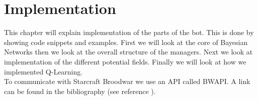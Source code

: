 \chapter{Implementation}
This chapter will explain implementation of the parts of the bot. This is done by showing code snippets and examples. First we will look at the core of Bayesian Networks then we look at the overall structure of the managers. Next we look at implementation of the different potential fields. Finally we will look at how we implemented Q-Learning.\\

To communicate with Starcraft Broodwar we use an API called BWAPI. A link can be found in the bibliography (see reference \cite{bwapi}).


	
	
	
	